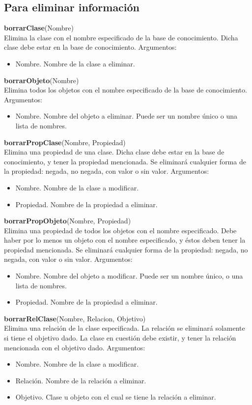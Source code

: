 \documentclass[11pt]{article}
\newcommand{\comando}[2]{
    \textbf{#1}(#2)\\
}
\newenvironment{args}{
    \newline
    Argumentos:
    \begin{itemize}
}{
    \end{itemize}
    \bigskip
}
\begin{document}
\subsection{Para eliminar información}

\comando{borrarClase}{Nombre}
Elimina la clase con el nombre especificado de la base de conocimiento. Dicha clase debe estar en la base de conocimiento.
\begin{args}
    \item Nombre. Nombre de la clase a eliminar.
\end{args}

\comando{borrarObjeto}{Nombre}
Elimina todos los objetos con el nombre especificado de la base de conocimiento.
\begin{args}
    \item Nombre. Nombre del objeto a eliminar. Puede ser un nombre único o una lista de nombres.
\end{args}

\comando{borrarPropClase}{Nombre, Propiedad}
Elimina una propiedad de una clase. Dicha clase debe estar en la base de conocimiento, y tener la propiedad mencionada. Se eliminará cualquier forma de la propiedad: negada, no negada, con valor o sin valor.
\begin{args}
    \item Nombre. Nombre de la clase a modificar.
    \item Propiedad. Nombre de la propiedad a eliminar.
\end{args}

\comando{borrarPropObjeto}{Nombre, Propiedad}
Elimina una propiedad de todos los objetos con el nombre especificado. Debe haber por lo menos un objeto con el nombre especificado, y éstos deben tener la propiedad mencionada. Se eliminará cualquier forma de la propiedad: negada, no negada, con valor o sin valor.
\begin{args}
    \item Nombre. Nombre del objeto a modificar. Puede ser un nombre único, o una lista de nombres.
    \item Propiedad. Nombre de la propiedad a eliminar.
\end{args}

\comando{borrarRelClase}{Nombre, Relacion, Objetivo}
Elimina una relación de la clase especificada. La relación se eliminará solamente si tiene el objetivo dado. La clase en cuestión debe existir, y tener la relación mencionada con el objetivo dado.
\begin{args}
    \item Nombre. Nombre de la clase a modificar.
    \item Relación. Nombre de la relación a eliminar.
    \item Objetivo. Clase u objeto con el cual se tiene la relación a eliminar.
\end{args}
\end{document}
